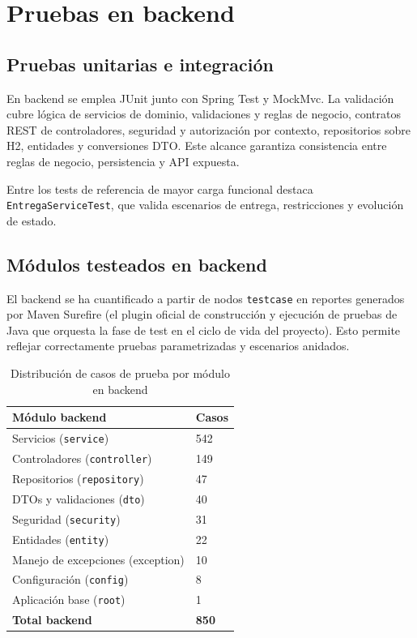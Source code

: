 \FloatBarrier
\section{Pruebas en backend}

\subsection{Pruebas unitarias e integraci\'on}

En backend se emplea JUnit junto con Spring Test y MockMvc.
La validaci\'on cubre l\'ogica de servicios de dominio, validaciones y reglas de negocio, contratos REST de controladores, seguridad y autorizaci\'on por contexto, repositorios sobre H2, entidades y conversiones DTO. Este alcance garantiza consistencia entre reglas de negocio, persistencia y API expuesta.

Entre los tests de referencia de mayor carga funcional destaca
\texttt{EntregaServiceTest}, que valida escenarios de entrega,
restricciones y evoluci\'on de estado.

\subsection{M\'odulos testeados en backend}

El backend se ha cuantificado a partir de nodos \texttt{testcase} en reportes generados por Maven Surefire (el plugin oficial de construcci\'on y ejecuci\'on de pruebas de Java que orquesta la fase de test en el ciclo de vida del proyecto). Esto permite reflejar correctamente pruebas parametrizadas y escenarios anidados.

\begin{table}[!htbp]
\centering
\begin{tabular}{|P{5.6cm}|P{2.2cm}|}
\hline
\textbf{M\'odulo backend} & \textbf{Casos} \\
\hline
Servicios (\texttt{service}) & 542 \\
\hline
Controladores (\texttt{controller}) & 149 \\
\hline
Repositorios (\texttt{repository}) & 47 \\
\hline
DTOs y validaciones (\texttt{dto}) & 40 \\
\hline
Seguridad (\texttt{security}) & 31 \\
\hline
Entidades (\texttt{entity}) & 22 \\
\hline
Manejo de excepciones (exception) & 10 \\
\hline
Configuraci\'on (\texttt{config}) & 8 \\
\hline
Aplicaci\'on base (\texttt{root}) & 1 \\
\hline
\textbf{Total backend} & \textbf{850} \\
\hline
\end{tabular}
\caption{Distribuci\'on de casos de prueba por m\'odulo en backend}
\label{tab:backend-modulos-testeados}
\end{table}

